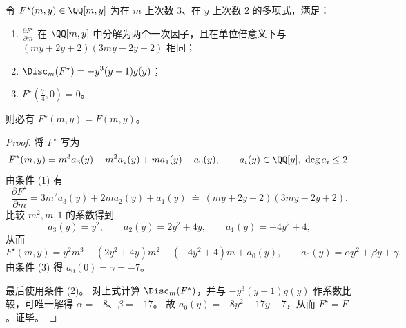 \begin{theorem}\label{thm:xi-ed-F-unique-reconstruction-from-discriminant-and-critical}
令 \(F^\star(m,y)\in\QQ[m,y]\) 为在 \(m\) 上次数 \(3\)、在 \(y\) 上次数 \(2\) 的多项式，满足：
\begin{enumerate}
  \item \(\frac{\partial F^\star}{\partial m}\) 在 \(\QQ[m,y]\) 中分解为两个一次因子，且在单位倍意义下与 \((my+2y+2)(3my-2y+2)\) 相同；
  \item \(\Disc_m(F^\star)=-y^3(y-1)g(y)\)；
  \item \(F^\star\!\left(\frac74,0\right)=0\)。
\end{enumerate}
则必有 \(F^\star(m,y)=F(m,y)\)。
\end{theorem}
\begin{proof}
将 \(F^\star\) 写为
\[
F^\star(m,y)=m^3a_3(y)+m^2a_2(y)+ma_1(y)+a_0(y),
\qquad a_i(y)\in\QQ[y],\ \deg a_i\le 2.
\]
由条件 (1) 有
\[
\frac{\partial F^\star}{\partial m}=3m^2a_3(y)+2ma_2(y)+a_1(y)\ \doteq\ (my+2y+2)(3my-2y+2).
\]
比较 \(m^2,m,1\) 的系数得到
\[
a_3(y)=y^2,\qquad a_2(y)=2y^2+4y,\qquad a_1(y)=-4y^2+4,
\]
从而
\[
F^\star(m,y)=y^2m^3+(2y^2+4y)m^2+(-4y^2+4)m+a_0(y),
\qquad
a_0(y)=\alpha y^2+\beta y+\gamma.
\]
由条件 (3) 得 \(a_0(0)=\gamma=-7\)。
\par
最后使用条件 (2)。
对上式计算 \(\Disc_m(F^\star)\)，并与 \(-y^3(y-1)g(y)\) 作系数比较，可唯一解得 \(\alpha=-8\)、\(\beta=-17\)。
故 \(a_0(y)=-8y^2-17y-7\)，从而 \(F^\star=F\)。证毕。
\end{proof}

